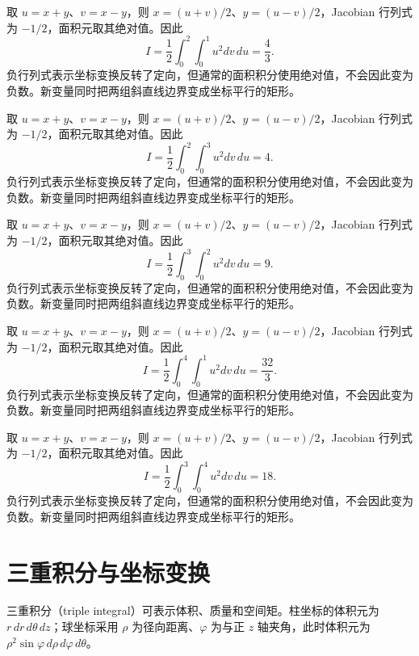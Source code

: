 \documentclass[12pt,fontset=fandol]{ctexart}
\begin{document}
\begin{solve}\label{ans:c37q20}
取 $u=x+y$、$v=x-y$，则 $x=(u+v)/2$、$y=(u-v)/2$，Jacobian 行列式为 $-1/2$，面积元取其绝对值。因此
\[
I=\frac12\int_0^{2}\int_0^{1}u^2dv\,du=\frac{4}{3}.
\]
负行列式表示坐标变换反转了定向，但通常的面积积分使用绝对值，不会因此变为负数。新变量同时把两组斜直线边界变成坐标平行的矩形。
\end{solve}

\begin{solve}\label{ans:c37q21}
取 $u=x+y$、$v=x-y$，则 $x=(u+v)/2$、$y=(u-v)/2$，Jacobian 行列式为 $-1/2$，面积元取其绝对值。因此
\[
I=\frac12\int_0^{2}\int_0^{3}u^2dv\,du=4.
\]
负行列式表示坐标变换反转了定向，但通常的面积积分使用绝对值，不会因此变为负数。新变量同时把两组斜直线边界变成坐标平行的矩形。
\end{solve}

\begin{solve}\label{ans:c37q22}
取 $u=x+y$、$v=x-y$，则 $x=(u+v)/2$、$y=(u-v)/2$，Jacobian 行列式为 $-1/2$，面积元取其绝对值。因此
\[
I=\frac12\int_0^{3}\int_0^{2}u^2dv\,du=9.
\]
负行列式表示坐标变换反转了定向，但通常的面积积分使用绝对值，不会因此变为负数。新变量同时把两组斜直线边界变成坐标平行的矩形。
\end{solve}

\begin{solve}\label{ans:c37q23}
取 $u=x+y$、$v=x-y$，则 $x=(u+v)/2$、$y=(u-v)/2$，Jacobian 行列式为 $-1/2$，面积元取其绝对值。因此
\[
I=\frac12\int_0^{4}\int_0^{1}u^2dv\,du=\frac{32}{3}.
\]
负行列式表示坐标变换反转了定向，但通常的面积积分使用绝对值，不会因此变为负数。新变量同时把两组斜直线边界变成坐标平行的矩形。
\end{solve}

\begin{solve}\label{ans:c37q24}
取 $u=x+y$、$v=x-y$，则 $x=(u+v)/2$、$y=(u-v)/2$，Jacobian 行列式为 $-1/2$，面积元取其绝对值。因此
\[
I=\frac12\int_0^{3}\int_0^{4}u^2dv\,du=18.
\]
负行列式表示坐标变换反转了定向，但通常的面积积分使用绝对值，不会因此变为负数。新变量同时把两组斜直线边界变成坐标平行的矩形。
\end{solve}

\clearpage
\section{三重积分与坐标变换}\label{sec:ch38}
三重积分（triple integral）可表示体积、质量和空间矩。柱坐标的体积元为 $r\,dr\,d\theta\,dz$；球坐标采用 $\rho$ 为径向距离、$\varphi$ 为与正 $z$ 轴夹角，此时体积元为 $\rho^2\sin\varphi\,d\rho\,d\varphi\,d\theta$。
\end{document}
